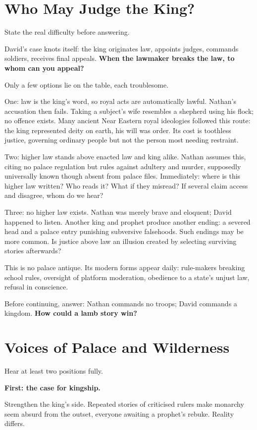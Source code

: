\section{Who May Judge the King?}
State the real difficulty before answering.

David's case knots itself: the king originates law, appoints judges, commands soldiers, receives final appeals. \textbf{When the lawmaker breaks the law, to whom can you appeal?}

Only a few options lie on the table, each troublesome.

One: law is the king's word, so royal acts are automatically lawful. Nathan's accusation then fails. Taking a subject's wife resembles a shepherd using his flock; no offence exists. Many ancient Near Eastern royal ideologies followed this route: the king represented deity on earth, his will was order. Its cost is toothless justice, governing ordinary people but not the person most needing restraint.

Two: higher law stands above enacted law and king alike. Nathan assumes this, citing no palace regulation but rules against adultery and murder, supposedly universally known though absent from palace files. Immediately: where is this higher law written? Who reads it? What if they misread? If several claim access and disagree, whom do we hear?

Three: no higher law exists. Nathan was merely brave and eloquent; David happened to listen. Another king and prophet produce another ending: a severed head and a palace entry punishing subversive falsehoods. Such endings may be more common. Is justice above law an illusion created by selecting surviving stories afterwards?

This is no palace antique. Its modern forms appear daily: rule-makers breaking school rules, oversight of platform moderation, obedience to a state's unjust law, refusal in conscience.

Before continuing, answer: Nathan commands no troops; David commands a kingdom. \textbf{How could a lamb story win?}

\section{Voices of Palace and Wilderness}
Hear at least two positions fully.

\textbf{First: the case for kingship.}

Strengthen the king's side. Repeated stories of criticised rulers make monarchy seem absurd from the outset, everyone awaiting a prophet's rebuke. Reality differs.

